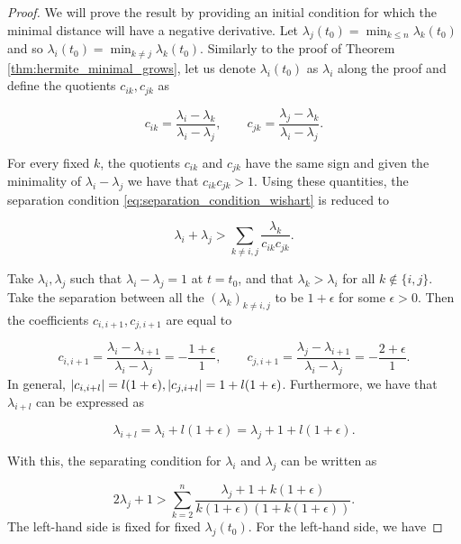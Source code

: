 \begin{proof}
    We will prove the result by providing an initial condition for which the minimal distance will have a negative derivative. Let $\lambda_j(t_0) = \min_{k \le n} \lambda_k(t_0)$ and so $\lambda_i(t_0) = \min_{k\neq j} \lambda_k(t_0)$. Similarly to the proof of Theorem \ref{thm:hermite_minimal_grows}, let us denote $\lambda_i(t_0)$ as $\lambda_i$ along the proof and define the quotients $c_{ik},c_{jk}$ as 

    \begin{equation*}
        c_{ik} = \frac{\lambda_i - \lambda_k}{\lambda_i - \lambda_j}, \qquad c_{jk} = \frac{\lambda_j - \lambda_k}{\lambda_i - \lambda_j}.
    \end{equation*}

    For every fixed $k$, the quotients $c_{ik}$ and $c_{jk}$ have the same sign and given the minimality of $\lambda_i - \lambda_j$ we have that $c_{ik}c_{jk}>1$. Using these quantities, the separation condition \eqref{eq:separation_condition_wishart} is reduced to 

    \begin{equation*}
        \lambda_i + \lambda_j > \sum_{k \neq i,j} \frac{\lambda_k}{c_{ik}c_{jk}}.
    \end{equation*}

    Take $\lambda_i, \lambda_j$ such that $\lambda_i - \lambda_j =1$ at $t=t_0$, and that $\lambda_k > \lambda_i$ for all $k \notin \{i,j\}$. Take the separation between all the $(\lambda_k)_{k\neq i,j}$ to be $1+\epsilon$ for some $\epsilon >0$. Then the coefficients $c_{i,i+1}, c_{j,i+1}$ are equal to

    \[ c_{i,i+1} = \frac{\lambda_i - \lambda_{i+1}}{\lambda_i - \lambda_j} = -\frac{1+\epsilon}{1}, \qquad c_{j,i+1} = \frac{\lambda_j - \lambda_{i+1}}{\lambda_i - \lambda_j} = -\frac{2+\epsilon}{1}. \]
    In general, $\lvert c_{i,i+l} \rvert=l(1+\epsilon), \lvert c_{j,i+l} \rvert = 1 + l(1+\epsilon)$. Furthermore, we have that $\lambda_{i+l}$ can be expressed as

    \begin{equation*}
         \lambda_{i+l} = \lambda_i + l(1+\epsilon) = \lambda_j + 1 + l(1+\epsilon).
    \end{equation*}

    With this, the separating condition for $\lambda_i$ and $\lambda_j$ can be written as

    \begin{equation*}
        2\lambda_j + 1 > \sum_{k=2}^{n} \frac{\lambda_j + 1 + k(1+\epsilon)}{k(1+\epsilon)(1+k(1+\epsilon))}. 
    \end{equation*}
    The left-hand side is fixed for fixed $\lambda_j(t_0)$. For the left-hand side, we have


\end{proof}
